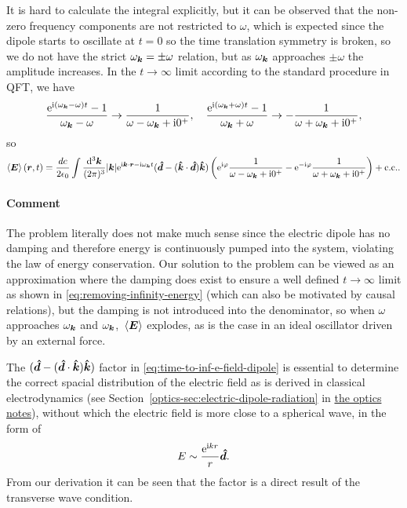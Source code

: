 \documentclass[hyperref, a4paper]{article}
\newcommand{\opticsdoc}{\href{../../optics/optics}{the optics notes}}
\newcommand*{\ii}{\mathrm{i}}
\newcommand*{\ee}{\mathrm{e}}
\begin{document}
It is hard to calculate the integral explicitly, but it can be observed that the non-zero frequency components are not restricted to $\omega$, which is expected since the dipole starts to oscillate at $t=0$ so the time translation symmetry is broken, so we do not have the strict $\omega_{\vb*{k}} = \pm \omega$ relation, but as $\omega_{\vb*{k}}$ approaches $\pm \omega$ the amplitude increases.
In the $t \to \infty$ limit according to the standard procedure in QFT, we have 
\begin{equation}
    \frac{\ee^{\ii (\omega_{\vb*{k}} - \omega) t} - 1}{\omega_{\vb*{k}} - \omega}  \to \frac{1}{\omega - \omega_{\vb*{k}} + \ii 0^+}, \quad \frac{\ee^{\ii (\omega_{\vb*{k}} + \omega) t} - 1}{\omega_{\vb*{k}} + \omega} \to - \frac{1}{\omega + \omega_{\vb*{k}} + \ii 0^+},
    \label{eq:removing-infinity-energy}
\end{equation}
so 
\begin{equation}
    \expval{\vb*{E}}(\vb*{r}, t) = \frac{d c}{2 \epsilon_0 } \int \frac{\dd[3]{\vb*{k}}}{(2\pi)^3} \abs{\vb*{k}} \ee^{\ii \vb*{k} \cdot \vb*{r} - \ii \omega_{\vb*{k}} t} (\vu*{d} - (\vu*{k} \cdot \vu*{d}) \vu*{k}) \left( \ee^{\ii \varphi} \frac{1}{\omega - \omega_{\vb*{k}} + \ii 0^+} - \ee^{- \ii \varphi} \frac{1}{\omega + \omega_{\vb*{k}} + \ii 0^+} \right) + \text{c.c.}.
    \label{eq:time-to-inf-e-field-dipole}
\end{equation}

\paragraph{Comment} The problem literally does not make much sense since the electric dipole has no damping and therefore energy is continuously pumped into the system, violating the law of energy conservation.
Our solution to the problem can be viewed as an approximation where the damping does exist to ensure a well defined $t \to \infty$ limit as shown in \eqref{eq:removing-infinity-energy} (which can also be motivated by causal relations), but the damping is not introduced into the denominator, so when $\omega$ approaches $\omega_{\vb*{k}}$ and $\omega_{\vb*{k}}$, $\expval*{\vb*{E}}$ explodes, as is the case in an ideal oscillator driven by an external force.

The $(\vu*{d} - (\vu*{d} \cdot \vu*{k}) \vu*{k})$ factor in \eqref{eq:time-to-inf-e-field-dipole} is essential to determine the correct spacial distribution of the electric field as is derived in classical electrodynamics (see Section~\ref{optics-sec:electric-dipole-radiation} in \opticsdoc), without which the electric field is more close to a spherical wave, in the form of 
\[
    E \sim \frac{\ee^{\ii k r}}{r} \vu*{d}.
\]
From our derivation it can be seen that the factor is a direct result of the transverse wave condition.
\end{document}

